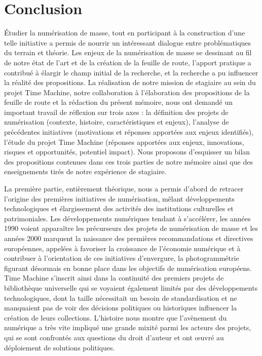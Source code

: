 \part*{Conclusion}

Étudier la numérisation de masse, tout en participant à la construction d'une telle initiative a permis de nourrir un intéressant dialogue entre problématiques du terrain et théorie. Les enjeux de la numérisation de masse se dessinant au fil de notre état de l'art et de la création de la feuille de route, l'apport pratique a contribué à élargir le champ initial de la recherche, et la recherche a pu influencer la réalité des propositions. La réalisation de notre mission de stagiaire au sein du projet Time Machine, notre collaboration à l'élaboration des propositions de la feuille de route et la rédaction du présent mémoire, nous ont demandé un important travail de réflexion sur trois axes : la définition des projets de numérisation (contexte, histoire, caractéristiques et enjeux), l'analyse de précédentes initiatives (motivations et réponses apportées aux enjeux identifiés), l'étude du projet Time Machine (réponses apportées aux enjeux, innovations, risques et opportunités, potentiel impact). Nous proposons d'esquisser un bilan des propositions contenues dans ces trois parties de notre mémoire ainsi que des enseignements tirés de notre expérience de stagiaire.

La première partie, entièrement théorique, nous a permis d'abord de retracer l'origine des premières initiatives de numérisation, mêlant développements technologiques et élargissement des activités des institutions culturelles et patrimoniales. Les développements numériques tendant à s'accélérer, les années 1990 voient apparaître les précurseurs des projets de numérisation de masse et les années 2000 marquent la naissance des premières recommandations et directives européennes, appelées à favoriser la croissance de l'économie numérique et à contribuer à l'orientation de ces initiatives d'envergure, la photogrammétrie figurant désormais en bonne place dans les objectifs de numérisation européens. Time Machine s'inscrit ainsi dans la continuité des premiers projets de bibliothèque universelle qui se voyaient également limités par des développements technologiques, dont la taille nécessitait un besoin de standardisation et ne manquaient pas de voir des décisions politiques ou historiques influencer la création de leurs collections. L'histoire nous montre que l'avènement du numérique a très vite impliqué une grande mixité parmi les acteurs des projets, qui se sont confrontés aux questions du droit d'auteur et ont \oe{}uvré au déploiement de solutions politiques.

